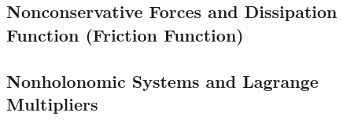 \documentclass[11pt,a4paper]{article}
\begin{document}
\subsection{Nonconservative Forces and Dissipation Function (Friction Function)}




\subsection{Nonholonomic Systems and Lagrange Multipliers}




\end{document}
